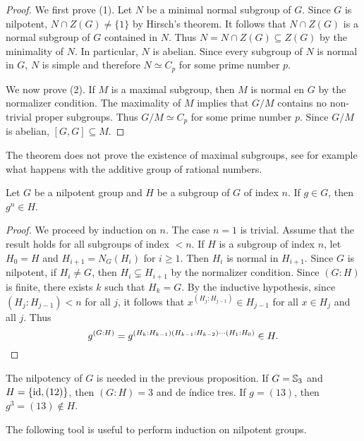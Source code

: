 \begin{proof}
	We first prove (1). Let $N$ be a minimal normal subgroup of $G$. Since $G$ is nilpotent, 
	$N\cap Z(G)\ne\{1\}$ by Hirsch's theorem. It follows that $N\cap Z(G)$ is a normal subgroup of $G$ contained in $N$. 
	Thus $N=N\cap Z(G)\subseteq
	Z(G)$ by the minimality of $N$. In particular, $N$ is abelian. Since 
	every subgroup of $N$ is normal in $G$, $N$ is simple and therefore $N\simeq
	C_p$ for some prime number $p$.

	We now prove (2). If $M$ is a maximal subgroup, then $M$
	is normal en $G$ by the normalizer condition. The maximality of $M$ implies that 
	$G/M$ contains no non-trivial proper subgroups. Thus 
	$G/M\simeq C_p$ for some prime number $p$. Since  
	$G/M$ is abelian, $[G,G]\subseteq M$. 
\end{proof}

The theorem does not prove the existence of maximal subgroups, see for example what happens with
the additive group of rational numbers. 

\begin{proposition}
	\label{pro:g^n}
	Let $G$ be a nilpotent group and $H$ be a subgroup of $G$ of index $n$. If 
	$g\in G$, then $g^n\in H$.
\end{proposition}

\begin{proof}
	We proceed by induction on $n$. The case $n=1$ is trivial. Assume that the result holds 
	for all subgroups of index $<n$. If $H$ is a subgroup of index $n$, let 
	$H_0=H$ and $H_{i+1}=N_G(H_i)$ for $i\geq1$. Then $H_{i}$ is normal in 
	$H_{i+1}$. Since $G$ is nilpotent, if $H_i\ne G$, then 
    $H_i\subsetneq H_{i+1}$ by the normalizer condition. Since  
	$(G:H)$ is finite, there exists $k$ such that $H_k=G$. By the inductive hypothesis, since
	$(H_j:H_{j-1})<n$ for all $j$, it follows that 
	$x^{(H_j:H_{j-1})}\in H_{j-1}$ for all $x\in H_j$ and all $j$. Thus   
	\[
		g^{(G:H)}=g^{(H_k:H_{k-1})(H_{k-1}:H_{k-2})\cdots (H_1:H_0)}\in H.\qedhere 
	\]
\end{proof}

\begin{example}
The nilpotency of $G$ is needed in the previous proposition. 
If $G=\mathbb{S}_3$ and $H=\{\operatorname{id},(12)\}$, then $(G:H)=3$ and  de índice tres. If 
$g=(13)$, then $g^{3}=(13)\not\in H$. 	
\end{example}

The following tool is useful to perform induction 
on nilpotent groups.  

